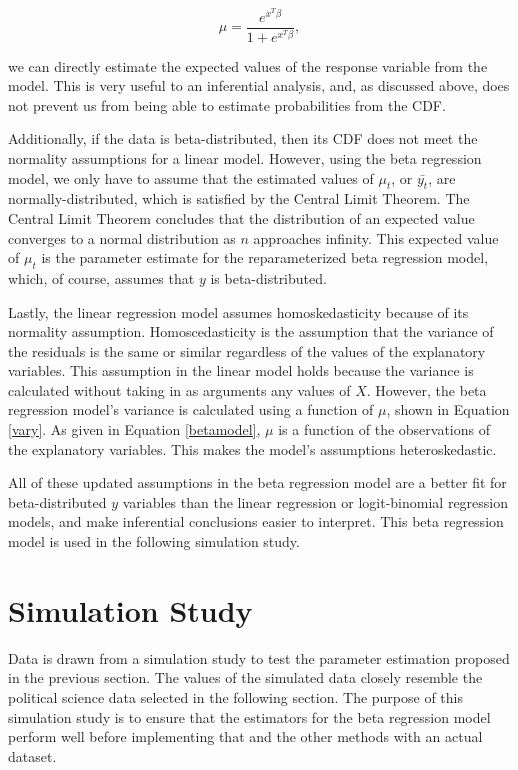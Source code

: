 \documentclass{svproc}
\begin{document}
\begin{equation}
\mu = \frac{e^{x^T \beta}}{1+e^{x^T \beta}} ,
\label{betamodel}
\end{equation}

we can directly estimate the expected values of the response variable from the model. This is very useful to an inferential analysis, and, as discussed above, does not prevent us from being able to estimate probabilities from the CDF.

Additionally, if the data is beta-distributed, then its CDF does not meet the normality assumptions for a linear model. However, using the beta regression model, we only have to assume that the estimated values of $\mu_t$, or $\bar{y_t}$, are normally-distributed, which is satisfied by the Central Limit Theorem. The Central Limit Theorem concludes that the distribution of an expected value converges to a normal distribution as $n$ approaches infinity. This expected value of $\mu_t$ is the parameter estimate for the reparameterized beta regression model, which, of course, assumes that $y$ is beta-distributed.

Lastly, the linear regression model assumes homoskedasticity because of its normality assumption. Homoscedasticity is the assumption that the variance of the residuals is the same or similar regardless of the values of the explanatory variables. This assumption in the linear model holds because the variance is calculated without taking in as arguments any values of $X$. However, the beta regression model's variance is calculated using a function of $\mu$, shown in Equation \ref{vary}. As given in Equation \ref{betamodel}, $\mu$ is a function of the observations of the explanatory variables. This makes the model's assumptions heteroskedastic.

All of these updated assumptions in the beta regression model are a better fit for beta-distributed $y$ variables than the linear regression or logit-binomial regression models, and make inferential conclusions easier to interpret. This beta regression model is used in the following simulation study.

\section{Simulation Study}

Data is drawn from a simulation study to test the parameter estimation proposed in the previous section. The values of the simulated data closely resemble the political science data selected in the following section. The purpose of this simulation study is to ensure that the estimators for the beta regression model perform well before implementing that and the other methods with an actual dataset.
\end{document}
